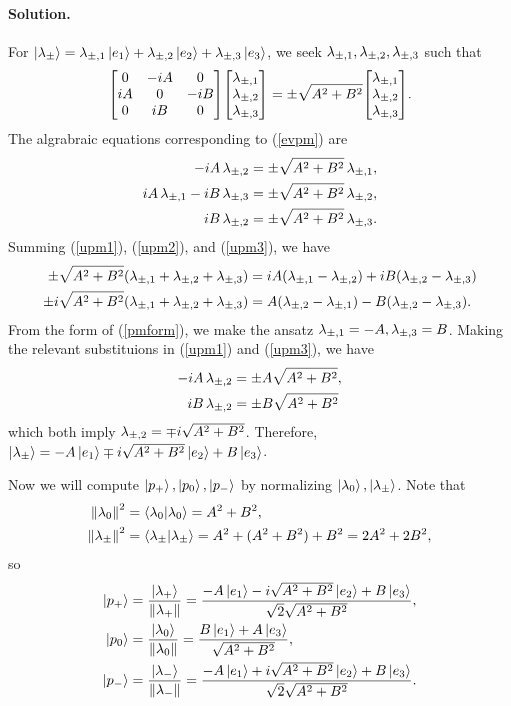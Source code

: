 \documentclass[11pt]{article}
\newcommand{\refeq}[1]{(\ref{#1})}
\newenvironment{solution}
{
    \paragraph{Solution.}
    \ignorespaces
}
{
    \bigskip
}
\begin{document}
\begin{solution}
	For $\ket{\lambda_\pm} = \lambda_{\pm,1} \ket{e_1} + \lambda_{\pm,2} \ket{e_2} + \lambda_{\pm,3} \ket{e_3}$, we seek $\lambda_{\pm,1}, \lambda_{\pm,2}, \lambda_{\pm,3}$ such that
	\begin{equation} \label{evpm}
		\mO \mqty[\upmq \\ \upmw \\ \upme] = \pmsq \mqty[\upmq \\ \upmw \\ \upme].
	\end{equation}
	The algrabraic equations corresponding to \refeq{evpm} are
	\begin{align}
		-iA \,\lambda_{\pm,2} &= \pm \sqrt{A^2 + B^2} \,\lambda_{\pm,1}, \label{upm1} \\
		iA \,\lambda_{\pm,1} - iB \,\lambda_{\pm,3} &= \pm \sqrt{A^2 + B^2} \,\lambda_{\pm,2}, \label{upm2} \\
		iB \,\lambda_{\pm,2} &= \pm \sqrt{A^2 + B^2} \,\lambda_{\pm,3}. \label{upm3}
	\end{align}
	Summing \refeq{upm1}, \refeq{upm2}, and \refeq{upm3}, we have
	\begin{align}
		\pm \sqrt{A^2 + B^2} (\lambda_{\pm,1} + \lambda_{\pm,2} + \lambda_{\pm,3}) &= iA (\lambda_{\pm,1} - \lambda_{\pm,2}) + iB (\lambda_{\pm,2} - \lambda_{\pm,3}) \\
		\pm i \sqrt{A^2 + B^2} (\lambda_{\pm,1} + \lambda_{\pm,2} + \lambda_{\pm,3}) &= A (\lambda_{\pm,2} - \lambda_{\pm,1}) - B (\lambda_{\pm,2} - \lambda_{\pm,3}). \label{pmform}
	\end{align}
	From the form of \refeq{pmform}, we make the ansatz $\lambda_{\pm,1} = -A, \lambda_{\pm,3} = B$.  Making the relevant substituions in \refeq{upm1} and \refeq{upm3}, we have
	\begin{align}
		-iA \,\lambda_{\pm,2} &= \pm A \sqrt{A^2 + B^2}, \\ 
		iB \,\lambda_{\pm,2} &= \pm B \sqrt{A^2 + B^2}
	\end{align}
	which both imply $\lambda_{\pm,2} = \mp i \sqrt{A^2 + B^2}$.  Therefore, $\ket{\lambda_\pm} = -A \ket{e_1} \mp i \sqrt{A^2 + B^2} \ket{e_2} + B \ket{e_3}$.
	
	Now we will compute $\ket{p_+}, \ket{p_0}, \ket{p_-}$ by normalizing $\ket{\lambda_0}, \ket{\lambda_\pm}$.  Note that
	\begin{align}
		\norm{\lambda_0}^2 &= \braket{\lambda_0}{\lambda_0} = A^2 + B^2, \\
		\norm{\lambda_\pm}^2 &= \braket{\lambda_\pm}{\lambda_\pm} = A^2 + (A^2 + B^2) + B^2 = 2 A^2 + 2 B^2,
	\end{align}
	so
	\begin{align}
		\ket{p_+} &= \frac{\ket{\lambda_+}}{\norm{\lambda_+}} = \frac{-A \ket{e_1} - i \sqrt{A^2 + B^2} \ket{e_2} + B \ket{e_3}}{\sqrt{2} \sqrt{A^2 + B^2}}, \\
		\ket{p_0} &= \frac{\ket{\lambda_0}}{\norm{\lambda_0}} = \frac{B \ket{e_1} + A \ket{e_3}}{\sqrt{A^2 + B^2}}, \label{p0} \\
		\ket{p_-} &= \frac{\ket{\lambda_-}}{\norm{\lambda_-}} = \frac{-A \ket{e_1} + i \sqrt{A^2 + B^2} \ket{e_2} + B \ket{e_3}}{\sqrt{2} \sqrt{A^2 + B^2}}.
	\end{align}
\end{solution}
\end{document}
